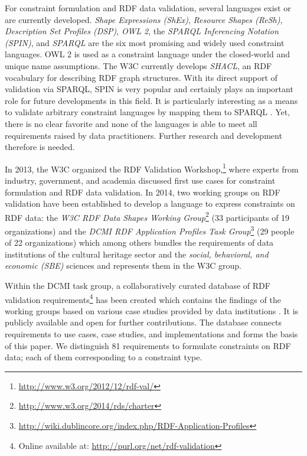 \documentclass{llncs}
\begin{document}
For constraint formulation and RDF data validation, several languages exist or are currently developed. \emph{Shape Expressions (ShEx)}, \emph{Resource Shapes (ReSh)}, \emph{Description Set Profiles (DSP)}, \emph{OWL 2}, the \emph{SPARQL Inferencing Notation (SPIN)}, and \emph{SPARQL} are the six most promising and widely used constraint languages. OWL 2 is used as a constraint language under the closed-world and unique name assumptions. The W3C currently develops \emph{SHACL}, an RDF vocabulary for describing RDF graph structures. With its direct support of validation via SPARQL, SPIN is very popular and certainly plays an important role for future developments in this field. It is particularly interesting as a means to validate arbitrary constraint languages by mapping them to SPARQL \cite{BoschEckert2014-2}. Yet, there is no clear favorite and none of the languages is able to meet all requirements raised by data practitioners. Further research and development therefore is needed.

In 2013, the W3C organized the RDF Validation Workshop,\footnote{\url{http://www.w3.org/2012/12/rdf-val/}} 
where experts from industry, government, and academia discussed first use cases for constraint formulation and RDF data validation.
In 2014, two working groups on RDF validation have been established to develop a language to express constraints on RDF data: 
the \emph{W3C RDF Data Shapes Working Group}\footnote{\url{http://www.w3.org/2014/rds/charter}} (33 participants of 19 organizations) and the \emph{DCMI RDF Application Profiles Task Group}\footnote{\url{http://wiki.dublincore.org/index.php/RDF-Application-Profiles}} (29 people of 22 organizations) which among others bundles the requirements of data institutions of the cultural heritage sector and the \emph{social, behavioral, and economic (SBE)} sciences and represents them in the W3C group. 

Within the DCMI task group, a collaboratively curated database of RDF validation requirements\footnote{Online available at: \url{http://purl.org/net/rdf-validation}} has been created which contains the findings of the working groups based on various case studies provided by data institutions \cite{BoschEckert2014}. It is publicly available and open for further contributions.
The database connects requirements to use cases, case studies, and implementations and forms the basis of this paper. 
We distinguish 81 requirements to formulate constraints on RDF data; 
each of them corresponding to a constraint type.
\end{document}
